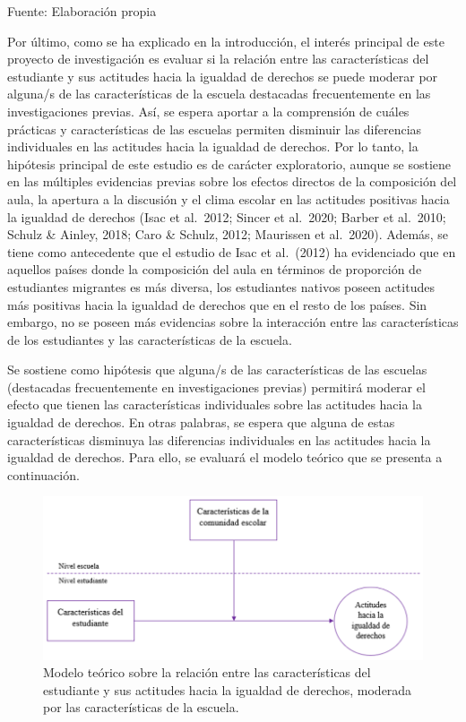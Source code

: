 \documentclass[12pt,twoside]{templates/facsothesis}
\begin{document}
\begin{center}

Fuente: Elaboración propia 

\end{center}

Por último, como se ha explicado en la introducción, el interés principal de este proyecto de investigación es evaluar si la relación entre las características del estudiante y sus actitudes hacia la igualdad de derechos se puede moderar por alguna/s de las características de la escuela destacadas frecuentemente en las investigaciones previas. Así, se espera aportar a la comprensión de cuáles prácticas y características de las escuelas permiten disminuir las diferencias individuales en las actitudes hacia la igualdad de derechos. Por lo tanto, la hipótesis principal de este estudio es de carácter exploratorio, aunque se sostiene en las múltiples evidencias previas sobre los efectos directos de la composición del aula, la apertura a la discusión y el clima escolar en las actitudes positivas hacia la igualdad de derechos (Isac et al.~2012; Sincer et al.~2020; Barber et al.~2010; Schulz \& Ainley, 2018; Caro \& Schulz, 2012; Maurissen et al.~2020). Además, se tiene como antecedente que el estudio de Isac et al.~(2012) ha evidenciado que en aquellos países donde la composición del aula en términos de proporción de estudiantes migrantes es más diversa, los estudiantes nativos poseen actitudes más positivas hacia la igualdad de derechos que en el resto de los países. Sin embargo, no se poseen más evidencias sobre la interacción entre las características de los estudiantes y las características de la escuela.

Se sostiene como hipótesis que alguna/s de las características de las escuelas (destacadas frecuentemente en investigaciones previas) permitirá moderar el efecto que tienen las características individuales sobre las actitudes hacia la igualdad de derechos. En otras palabras, se espera que alguna de estas características disminuya las diferencias individuales en las actitudes hacia la igualdad de derechos. Para ello, se evaluará el modelo teórico que se presenta a continuación.

\begin{figure}

{\centering \includegraphics[width=0.9\linewidth]{input/images/modelo_3} 

}

\caption{Modelo teórico sobre la relación entre las características del estudiante y sus actitudes hacia la igualdad de derechos, moderada por las características de la escuela.}\label{fig:unnamed-chunk-4}
\end{figure}
\end{document}
